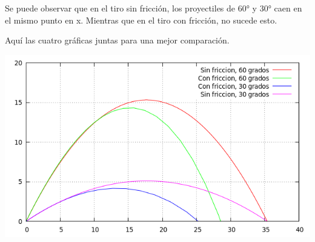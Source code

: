 \documentclass[12pt]{article}
\begin{document}
Se puede observar que en el tiro sin fricción, los proyectiles de 60° y 30° caen en el mismo punto en x. Mientras que en el tiro con fricción, no sucede esto.

Aquí las cuatro gráficas juntas para una mejor comparación.

\begin{center}
\includegraphics[width=15cm]{grafambos.png}\\
\end{center}
\end{document}

